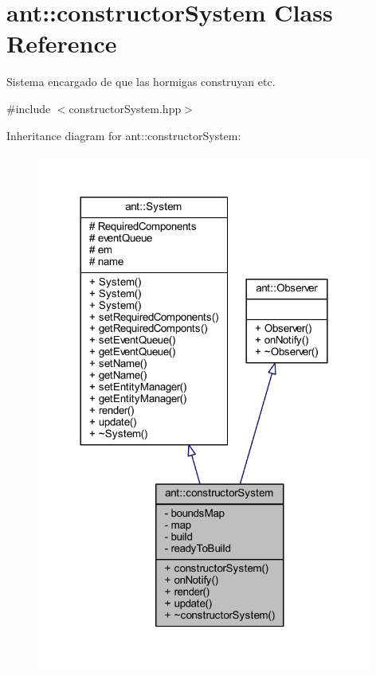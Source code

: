 \hypertarget{classant_1_1constructor_system}{\section{ant\+:\+:constructor\+System Class Reference}
\label{classant_1_1constructor_system}
}


Sistema encargado de que las hormigas construyan etc.  




{\ttfamily \#include $<$constructor\+System.\+hpp$>$}



Inheritance diagram for ant\+:\+:constructor\+System\+:
\nopagebreak
\begin{figure}[H]
\begin{center}
\leavevmode
\includegraphics[width=312pt]{dd/d5f/classant_1_1constructor_system__inherit__graph}
\end{center}
\end{figure}


